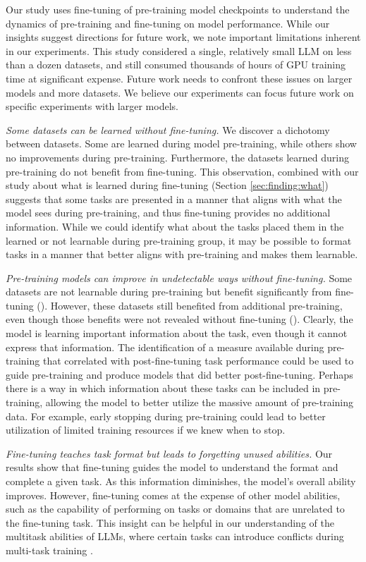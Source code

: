 Our study uses fine-tuning of pre-training model checkpoints to understand the dynamics of pre-training and fine-tuning on model performance. 
While our insights suggest directions for future work, we note important limitations inherent in our experiments. 
This study considered a single, relatively small LLM on less than a dozen datasets, and still consumed thousands of hours of GPU training time at significant expense. 
Future work needs to confront these issues on larger models and more datasets. We believe our experiments can focus future work on specific experiments with larger models.


{\em Some datasets can be learned without fine-tuning.}
We discover a dichotomy between datasets. 
Some are learned during model pre-training, while others show no improvements during pre-training. 
Furthermore, the datasets learned during pre-training do not benefit from fine-tuning. 
This observation, combined with our study about what is learned during fine-tuning (Section \ref{sec:finding:what}) suggests that some tasks are presented in a manner that aligns with what the model sees during pre-training, and thus fine-tuning provides no additional information. 
While we could identify what about the tasks placed them in the learned or not learnable during pre-training group, it may be possible to format tasks in a manner that better aligns with pre-training and makes them learnable.

{\em Pre-training models can improve in undetectable ways without fine-tuning.}
Some datasets are not learnable during pre-training but benefit significantly from fine-tuning (). 
However, these datasets still benefited from additional pre-training, even though those benefits were not revealed without fine-tuning ().
Clearly, the model is learning important information about the task, even though it cannot express that information.
The identification of a measure available during pre-training that correlated with post-fine-tuning task performance could be used to guide pre-training and produce models that did better post-fine-tuning. 
Perhaps there is a way in which information about these tasks can be included in pre-training, allowing the model to better utilize the massive amount of pre-training data.
For example, early stopping during pre-training could lead to better utilization of limited training resources if we knew when to stop.


{\em Fine-tuning teaches task format but leads to forgetting unused abilities.}
Our results show that fine-tuning guides the model to understand the format and complete a given task. As this information diminishes, the model's overall ability improves. 
However, fine-tuning comes at the expense of other model abilities, such as the capability of performing on tasks or domains that are unrelated to the fine-tuning task. 
This insight can be helpful in our understanding of the multitask abilities of LLMs, where certain tasks can introduce conflicts during multi-task training \cite{mueller-etal-2022-text}.








